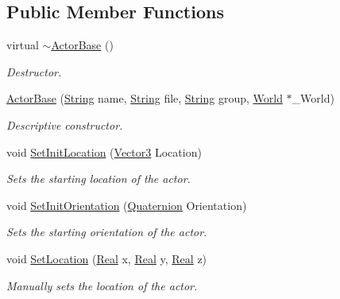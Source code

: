 \subsection*{Public Member Functions}
\begin{DoxyCompactItemize}
\item 
virtual \hyperlink{classphys_1_1ActorBase_a5e5d4b50c83c6851e554b5e7ad65403f}{$\sim$ActorBase} ()
\begin{DoxyCompactList}\small\item\em Destructor. \item\end{DoxyCompactList}\item 
\hyperlink{classphys_1_1ActorBase_ad9d90a68921ce81653e9950c1330809d}{ActorBase} (\hyperlink{namespacephys_aa03900411993de7fbfec4789bc1d392e}{String} name, \hyperlink{namespacephys_aa03900411993de7fbfec4789bc1d392e}{String} file, \hyperlink{namespacephys_aa03900411993de7fbfec4789bc1d392e}{String} group, \hyperlink{classphys_1_1World}{World} $\ast$\_\-World)
\begin{DoxyCompactList}\small\item\em Descriptive constructor. \item\end{DoxyCompactList}\item 
void \hyperlink{classphys_1_1ActorBase_a0ff0980bcf33a8205eb058b8caa1f36b}{SetInitLocation} (\hyperlink{classphys_1_1Vector3}{Vector3} Location)
\begin{DoxyCompactList}\small\item\em Sets the starting location of the actor. \item\end{DoxyCompactList}\item 
void \hyperlink{classphys_1_1ActorBase_a681186465db767954ca3f9530a1d7c36}{SetInitOrientation} (\hyperlink{classphys_1_1Quaternion}{Quaternion} Orientation)
\begin{DoxyCompactList}\small\item\em Sets the starting orientation of the actor. \item\end{DoxyCompactList}\item 
void \hyperlink{classphys_1_1ActorBase_a0b0db2ec0f4926326635b86f1ead2276}{SetLocation} (\hyperlink{namespacephys_af7eb897198d265b8e868f45240230d5f}{Real} x, \hyperlink{namespacephys_af7eb897198d265b8e868f45240230d5f}{Real} y, \hyperlink{namespacephys_af7eb897198d265b8e868f45240230d5f}{Real} z)
\begin{DoxyCompactList}\small\item\em Manually sets the location of the actor. \item\end{DoxyCompactList}\item 

\end{DoxyCompactItemize}
